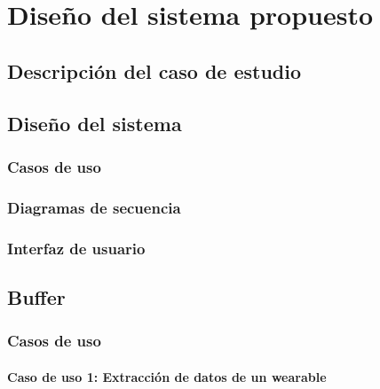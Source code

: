 \chapter{Diseño del sistema propuesto}
\label{chapter:disenio}


\section{Descripción del caso de estudio} \label{section:CasoEstudio}


\section{Diseño del sistema}

    \subsection{Casos de uso}
    \subsection{Diagramas de secuencia}
    \subsection{Interfaz de usuario}

\section{Buffer}

\subsection{Casos de uso}

    \subsubsection{Caso de uso 1: Extracción de datos de un \gls{wearable}}


